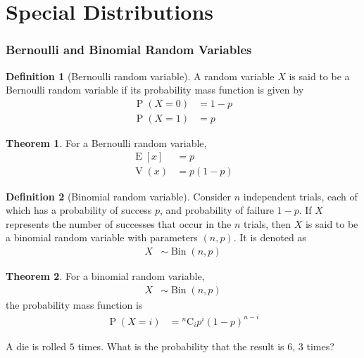 \documentclass[titlepage, fleqn, a4paper, 12pt, twoside]{article}
\theoremstyle{definition}
\newtheorem{definition}{Definition}
\theoremstyle{theorem}
\newtheorem{theorem}{Theorem}
\DeclareMathOperator{\prob}{\mathrm{P}}
\DeclareMathOperator{\expct}{\mathrm{E}}
\DeclareMathOperator{\var}{\mathrm{V}}
\DeclareMathOperator{\bin}{\mathrm{Bin}}
\newcommand*{\comb}[2]{{}^{#1}\mathrm{C}_{#2}}%
\begin{document}
\clearpage
\part{Special Distributions}

\section{Bernoulli and Binomial Random Variables}

\begin{definition}[Bernoulli random variable]
	A random variable $X$ is said to be a Bernoulli random variable if its probability mass function is given by
	\begin{align*}
		\prob(X = 0) & = 1 - p \\
		\prob(X = 1) & = p
	\end{align*}
\end{definition}

\begin{theorem}
	For a Bernoulli random variable,
	\begin{align*}
		\expct[x] & = p \\
		\var(x)   & = p (1 - p)
	\end{align*}
\end{theorem}

\begin{definition}[Binomial random variable]
	Consider $n$ independent trials, each of which has a probability of success $p$, and probability of failure $1 - p$.
	If $X$ represents the number of successes that occur in the $n$ trials, then $X$ is said to be a binomial random variable with parameters $(n,p)$.
	It is denoted as
	\begin{align*}
		X & \sim \bin(n,p)
	\end{align*}
\end{definition}

\begin{theorem}
	For a binomial random variable,
	\begin{align*}
		X & \sim \bin(n,p)
	\end{align*}
	the probability mass function is
	\begin{align*}
		\prob(X = i) & = \comb{n}{i} p^i (1 - p)^{n - i}
	\end{align*}
\end{theorem}

\begin{question}
	A die is rolled $5$ times.
	What is the probability that the result is $6$, $3$ times?
\end{question}
\end{document}
